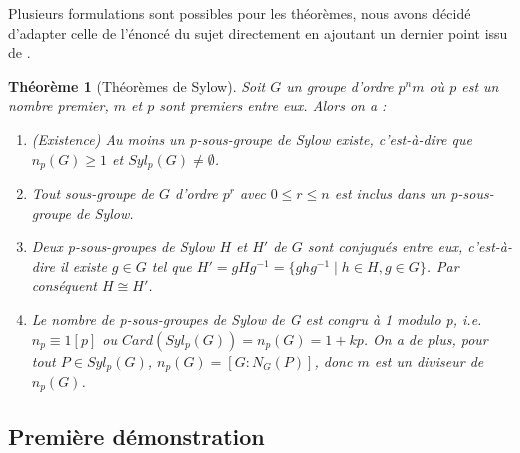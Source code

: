 \documentclass{article}
\theoremstyle{definition}
\theoremstyle{plain}
\newtheorem{theorem}[subsubsection]{Théorème}
\theoremstyle{plain}
\theoremstyle{plain}
\theoremstyle{plain}
\theoremstyle{plain}
\theoremstyle{definition}
\theoremstyle{plain}
\theoremstyle{plain}
\begin{document}
Plusieurs formulations sont possibles pour les théorèmes, 
nous avons décidé d'adapter celle de l'énoncé du sujet directement en ajoutant un dernier point issu de \cite[p.~215]{chen2024napkin}.

\begin{theorem}[Théorèmes de Sylow]\label{theorem:S}
	Soit \( G \) un groupe d'ordre \( p^{n}m \) où \( p \) est un nombre premier, \( m \) et \( p \) sont premiers entre eux. Alors on a :
	\begin{enumerate}[label={\upshape(\roman*)}]
		\item (Existence) Au moins un p-sous-groupe de Sylow existe, c'est-à-dire que \( n_{p}(G) \geq 1 \) et \( Syl_{p}(G) \neq \emptyset \).\label{theorem:S1}
		\item Tout sous-groupe de \( G \) d'ordre \( p^{r} \) avec \( 0 \leq r \leq n \) est inclus dans un p-sous-groupe de Sylow. \label{theorem:S2}
		\item Deux p-sous-groupes de Sylow \( H \) et \( H' \) de \( G \) sont conjugués entre eux, c'est-à-dire il existe \( g \in G \) tel que \( H' = gHg^{-1} = \{ ghg^{-1} \mid h \in H, g \in G \} \). Par conséquent \( H \cong H' \).\label{theorem:S3}
		\item Le nombre de p-sous-groupes de Sylow de G est congru à 1 modulo p, i.e. \( n_{p} \equiv 1 [p] \) ou \( Card(Syl_{p}({G})) = n_{p}(G) = 1 + kp \). 
			On a de plus, pour tout \( P \in Syl_{p}({G}) \), \( n_{p}({G}) = [G : N_{G}({P}) ] \), donc \( m \) est un diviseur de \( n_p({G}) \).\label{theorem:S4}
	\end{enumerate}

\end{theorem}

\subsection{Première démonstration}
\end{document}

